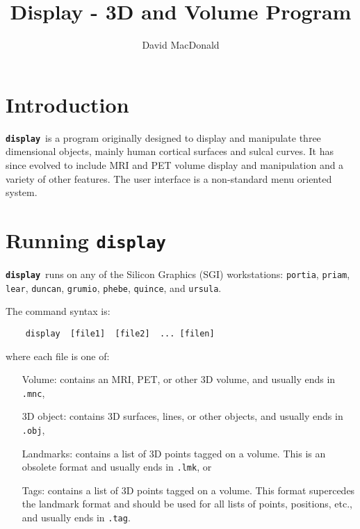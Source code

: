 
\title{Display - 3D and Volume Program}
\author{David MacDonald}

\newcommand{\display}{{\bf\tt display}\ }
\newcommand{\menu}[1]{\fbox{\sc\bf #1}}
\newcommand{\menutwo}[2]{\fbox{\sc\bf #1}/\fbox{\sc\bf #2}}
\newcommand{\menuthree}[3]{\fbox{\sc\bf #1}/\fbox{\sc\bf #2}/\fbox{\sc\bf #3}}

\psdraft



\maketitle

\newpage

\tableofcontents

\newpage

\section{Introduction}

\display is a program originally designed to display and manipulate
three dimensional objects,
mainly human cortical surfaces and sulcal curves.  It has since evolved to
include MRI and PET volume display and manipulation and a variety of other
features.  The user interface is a non-standard menu oriented system.

\section{Running \display}

\display runs on any of the Silicon Graphics (SGI) workstations:
{\tt portia}, {\tt priam}, {\tt lear}, {\tt duncan}, {\tt grumio},
{\tt phebe}, {\tt quince}, and {\tt ursula}.

The command syntax is:

\begin{verbatim}
    display  [file1]  [file2]  ... [filen]
\end{verbatim}

where each file is one of:

\begin{itemize}

\item[Volume:]  contains an MRI, PET, or other 3D volume, and usually ends
                    in {\tt .mnc},

\item[3D object:]  contains 3D surfaces, lines, or other objects, and usually
                    ends in {\tt .obj},

\item[Landmarks:]  contains a list of 3D points tagged on a volume.  This is
                  an obsolete format and usually ends in {\tt .lmk}, or

\item[Tags:]  contains a list of 3D points tagged on a volume.  This format
             supercedes the landmark format and should be used for all
             lists of points, positions, etc., and usually ends in {\tt .tag}.
\end{itemize}


